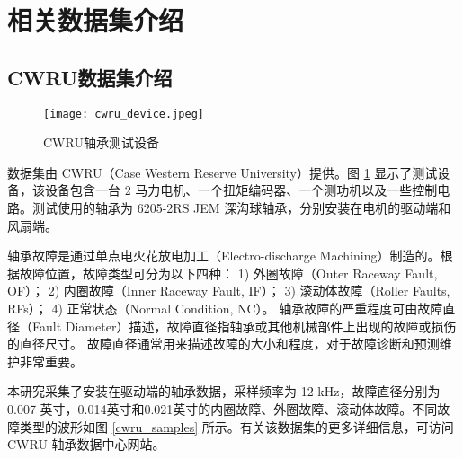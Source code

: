 \documentclass[master]{thesis-uestc}
\begin{document}
\section{相关数据集介绍}
\subsection{CWRU数据集介绍}
\begin{figure}
    \centering
    \texttt{[image: cwru\_device.jpeg]}
    \caption{CWRU轴承测试设备}
    \label{cwru_device}
\end{figure}
数据集由 CWRU（Case Western Reserve University）提供。图 \ref{cwru_device} 显示了测试设备，该设备包含一台 2 马力电机、一个扭矩编码器、一个测功机以及一些控制电路。测试使用的轴承为 6205-2RS JEM 深沟球轴承，分别安装在电机的驱动端和风扇端。  

轴承故障是通过单点电火花放电加工（Electro-discharge Machining）制造的。根据故障位置，故障类型可分为以下四种：  
1) 外圈故障（Outer Raceway Fault, OF）；  
2) 内圈故障（Inner Raceway Fault, IF）；  
3) 滚动体故障（Roller Faults, RFs）；  
4) 正常状态（Normal Condition, NC）。  
轴承故障的严重程度可由故障直径（Fault Diameter）描述，故障直径指轴承或其他机械部件上出现的故障或损伤的直径尺寸。 故障直径通常用来描述故障的大小和程度，对于故障诊断和预测维护非常重要。

本研究采集了安装在驱动端的轴承数据，采样频率为 12 kHz，故障直径分别为 0.007 英寸，0.014英寸和0.021英寸的内圈故障、外圈故障、滚动体故障。不同故障类型的波形如图 \ref{cwru_samples} 所示。有关该数据集的更多详细信息，可访问 CWRU 轴承数据中心网站。  
\end{document}
